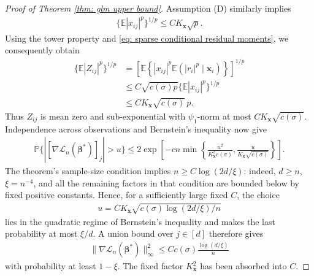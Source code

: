 \documentclass[letterpaper,12pt]{article}
\numberwithin{equation}{section}
\theoremstyle{plain}
\numberwithin{Theorem}{section}
\numberwithin{proposition}{section}
\numberwithin{Lemma}{section}
{
	\theoremstyle{definition}
	\newtheorem{Definition}{Definition}
	\newtheorem{example}{Example}
	\numberwithin{example}{section}
	\newtheorem{fact}{Fact}
	\numberwithin{fact}{section}
	\newtheorem{remark}{Remark}
}
\newcommand{\1}{\mathbbm{1}}
\def\bbeta{{\boldsymbol{\beta}}}
\def\Pr{\mathbb P}
\def\E{\mathbb{E}}
\def\L{{\mathcal L}}
\begin{document}
\begin{proof}[Proof of Theorem \ref{thm: glm upper bound}]
Assumption (D) similarly implies
\begin{align*}
\{\E|x_{ij}|^p\}^{1/p}\leq CK_{\bm x}\sqrt p.
\end{align*}
Using the tower property and \eqref{eq: sparse conditional residual moments},
we consequently obtain
\begin{align}
\{\E|Z_{ij}|^p\}^{1/p}
&=\left[\E\left\{|x_{ij}|^p
\E(|r_i|^p\mid\bm x_i)\right\}\right]^{1/p}\\
&\leq C\sqrt{c(\sigma)p}\{\E|x_{ij}|^p\}^{1/p}\\
&\leq CK_{\bm x}\sqrt{c(\sigma)}\,p.                    \label{eq: sparse score product moments}
\end{align}
Thus \(Z_{ij}\) is mean zero and sub-exponential with
\(\psi_1\)-norm at most \(CK_{\bm x}\sqrt{c(\sigma)}\).
Independence across observations and Bernstein's inequality now give
\begin{align*}
\Pr\{|[\nabla\L_n(\bbeta^*)]_j|>u\}
\leq2\exp\left[-cn\min\left\{
\frac{u^2}{K_{\bm x}^2c(\sigma)},
\frac{u}{K_{\bm x}\sqrt{c(\sigma)}}\right\}\right].
\end{align*}
The theorem's sample-size condition implies
\(n\geq C\log(2d/\xi)\): indeed, \(d\geq n\),
\(\xi=n^{-4}\), and all the remaining factors in that condition are
bounded below by fixed positive constants.  Hence, for a sufficiently
large fixed \(C\), the choice
\begin{align*}
u=CK_{\bm x}\sqrt{c(\sigma)\log(2d/\xi)/n}
\end{align*}
lies in the quadratic regime of Bernstein's inequality and makes the
last probability at most \(\xi/d\).  A union bound over \(j\in[d]\)
therefore gives
\begin{align}
    \|\nabla\L_n(\bbeta^*)\|_\infty^2
    \leq Cc(\sigma)\frac{\log(d/\xi)}{n}                    \label{eq: repaired sparse score concentration}
\end{align}
with probability at least $1-\xi$.  The fixed factor
\(K_{\bm x}^2\) has been absorbed into \(C\).


\end{proof}
\end{document}
